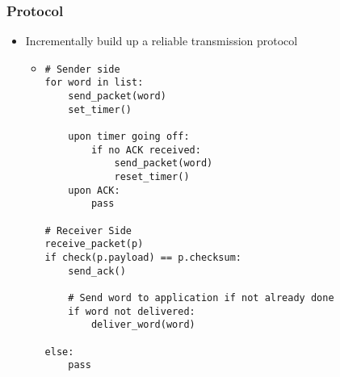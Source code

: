 \subsubsection{Protocol}
\begin{itemize}
    \item Incrementally build up a reliable transmission protocol
        \begin{itemize}
             Lossless transmission
            \item
\begin{verbatim}
# Sender side
for word in list:
    send_packet(word)
    set_timer()

    upon timer going off:
        if no ACK received:
            send_packet(word)
            reset_timer()
    upon ACK:
        pass

# Receiver Side
receive_packet(p)
if check(p.payload) == p.checksum:
    send_ack()

    # Send word to application if not already done
    if word not delivered:
        deliver_word(word)

else:
    pass


\end{verbatim}
\end{itemize}
\end{itemize}
